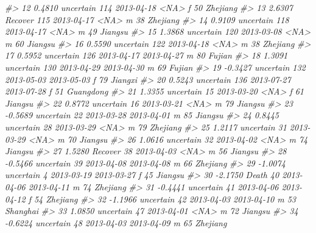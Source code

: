 \documentclass[]{book}
\newenvironment{Shaded}{\begin{snugshade}}{\end{snugshade}}
\newcommand{\CommentTok}[1]{\textcolor[rgb]{0.56,0.35,0.01}{\textit{#1}}}
\begin{document}
\begin{Shaded}
\begin{Highlighting}[]
{\CommentTok{#> 12     0.4810         uncertain     114    2013-04-18                    <NA>      f  50  Zhejiang}
\CommentTok{#> 13     2.6307           Recover     115    2013-04-17                    <NA>      m  38  Zhejiang}
\CommentTok{#> 14     0.9109         uncertain     118    2013-04-17                    <NA>      m  49   Jiangsu}
\CommentTok{#> 15     1.3868         uncertain     120    2013-03-08                    <NA>      m  60   Jiangsu}
\CommentTok{#> 16     0.5590         uncertain     122    2013-04-18                    <NA>      m  38  Zhejiang}
\CommentTok{#> 17     0.5952         uncertain     126    2013-04-17              2013-04-27      m  80    Fujian}
\CommentTok{#> 18     1.3091         uncertain     130    2013-04-29              2013-04-30      m  69    Fujian}
\CommentTok{#> 19    -0.3427         uncertain     132    2013-05-03              2013-05-03      f  79   Jiangxi}
\CommentTok{#> 20     0.5243         uncertain     136    2013-07-27              2013-07-28      f  51 Guangdong}
\CommentTok{#> 21     1.3355         uncertain      15    2013-03-20                    <NA>      f  61   Jiangsu}
\CommentTok{#> 22     0.8772         uncertain      16    2013-03-21                    <NA>      m  79   Jiangsu}
\CommentTok{#> 23    -0.5689         uncertain      22    2013-03-28              2013-04-01      m  85   Jiangsu}
\CommentTok{#> 24     0.8445         uncertain      28    2013-03-29                    <NA>      m  79  Zhejiang}
\CommentTok{#> 25     1.2117         uncertain      31    2013-03-29                    <NA>      m  70   Jiangsu}
\CommentTok{#> 26     1.0616         uncertain      32    2013-04-02                    <NA>      m  74   Jiangsu}
\CommentTok{#> 27     1.5280           Recover      38    2013-04-03                    <NA>      m  56   Jiangsu}
\CommentTok{#> 28    -0.5466         uncertain      39    2013-04-08              2013-04-08      m  66  Zhejiang}
\CommentTok{#> 29    -1.0074         uncertain       4    2013-03-19              2013-03-27      f  45   Jiangsu}
\CommentTok{#> 30    -2.1750             Death      40    2013-04-06              2013-04-11      m  74  Zhejiang}
\CommentTok{#> 31    -0.4441         uncertain      41    2013-04-06              2013-04-12      f  54  Zhejiang}
\CommentTok{#> 32    -1.1966         uncertain      42    2013-04-03              2013-04-10      m  53  Shanghai}
\CommentTok{#> 33     1.0850         uncertain      47    2013-04-01                    <NA>      m  72   Jiangsu}
\CommentTok{#> 34    -0.6224         uncertain      48    2013-04-03              2013-04-09      m  65  Zhejiang}
}
\end{Highlighting}
\end{Shaded}
\end{document}
